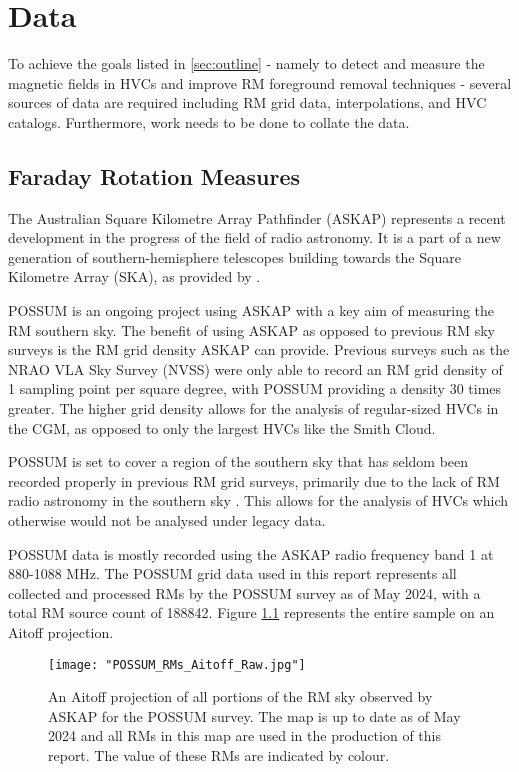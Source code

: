 \chapter{Data}
\label{cha:data}

To achieve the goals listed in \ref{sec:outline} - namely to detect and measure the magnetic fields in HVCs and improve RM foreground removal techniques - several sources of data are required including RM grid data, interpolations, and HVC catalogs. Furthermore, work needs to be done to collate the data.

\section{Faraday Rotation Measures}
\label{sec:ASKAP}

The Australian Square Kilometre Array Pathfinder (ASKAP) represents a recent development in the progress of the field of radio astronomy. It is a part of a new generation of southern-hemisphere telescopes building towards the Square Kilometre Array (SKA), as provided by \cite{ID61, ID52, ID71}.


POSSUM is an ongoing project using ASKAP with a key aim of measuring the RM southern sky. The benefit of using ASKAP as opposed to previous RM sky surveys is the RM grid density ASKAP can provide. Previous surveys such as the NRAO VLA Sky Survey (NVSS) were only able to record an RM grid density of 1 sampling point per square degree, with POSSUM providing a density 30 times greater. The higher grid density allows for the analysis of regular-sized HVCs in the CGM, as opposed to only the largest HVCs like the Smith Cloud.


POSSUM is set to cover a region of the southern sky that has seldom been recorded properly in previous RM grid surveys, primarily due to the lack of RM radio astronomy in the southern sky \citep{ID44, ID45, ID52, ID71}. This allows for the analysis of HVCs which otherwise would not be analysed under legacy data.


POSSUM data is mostly recorded using the ASKAP radio frequency band 1 at 880-1088 MHz. The POSSUM grid data used in this report represents all collected and processed RMs by the POSSUM survey as of May 2024, with a total RM source count of 188842. Figure \ref{fig:rm_map} represents the entire sample on an Aitoff projection.

\begin{figure}
    \texttt{[image: "POSSUM\_RMs\_Aitoff\_Raw.jpg"]}
    \centering
    \caption{An Aitoff projection of all portions of the RM sky observed by ASKAP for the POSSUM survey. The map is up to date as of May 2024 and all RMs in this map are used in the production of this report. The value of these RMs are indicated by colour.}
    \label{fig:rm_map}
\end{figure}

